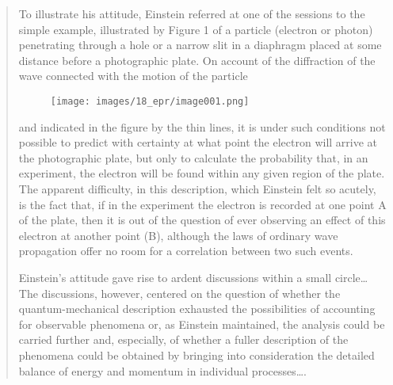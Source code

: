 \documentclass[11pt]{memoir}
\begin{document}
\begin{quote}
To illustrate his attitude, Einstein referred at one of the
sessions to the simple example, illustrated by Figure 1 of a particle
(electron or photon) penetrating through a hole or a narrow slit in a
diaphragm placed at some distance before a photographic plate. On
account of the diffraction of the wave connected with the motion of the
particle 
%
\begin{figure}[h] %
  \begin{center}
    \texttt{[image: images/18\_epr/image001.png]}
  \end{center}
\end{figure}
%
and indicated in the figure by the thin lines, it is under such
conditions not possible to predict with certainty at what point the
electron will arrive at the photographic plate, but only to calculate
the probability that, in an experiment, the electron will be found
within any given region of the plate. The apparent difficulty, in this
description, which Einstein felt so acutely, is the fact that, if in the
experiment the electron is recorded at one point A of the plate, then it
is out of the question of ever observing an effect of this electron at
another point (B), although the laws of ordinary wave propagation offer
no room for a correlation between two such events.

Einstein's attitude gave rise to ardent discussions within a small
circle\ldots{} The discussions, however, centered on the question of
whether the quant\-um-me\-chan\-i\-cal description exhausted the possibilities
of accounting for observable phenomena or, as Einstein maintained, the
analysis could be carried further and, especially, of whether a fuller
description of the phenomena could be obtained by bringing into
consideration the detailed balance of energy and momentum in individual
processes\ldots.


\end{quote}
\end{document}
